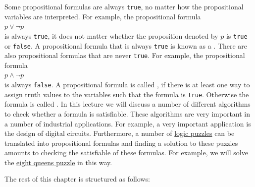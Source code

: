 Some propositional formulas are always \texttt{true}, no matter how the propositional variables are interpreted.
For example, the propositional formula 
\\[0.2cm]
\hspace*{1.3cm}
$p \vee \neg p$
\\[0.2cm]
is always \texttt{true}, it does not matter whether the proposition denoted by $p$ is \texttt{true} or \texttt{false}.  A propositional
formula that is always \texttt{true} is known as a  .  There are also propositional
formulas that are never \texttt{true}.  For example, the propositional formula
\\[0.2cm]
\hspace*{1.3cm}
$p \wedge \neg p$
\\[0.2cm]
is always \texttt{false}.  A propositional formula is called , if there is at least
one way to assign truth values to the variables such that the formula is \texttt{true}.  Otherwise the formula is called
.  In this lecture we will discuss a number of different algorithms to
check whether a formula is satisfiable.  These algorithms are very important in a number of industrial
applications.  For example, a very important application is the design of digital circuits.
Furthermore, a number of \href{https://en.wikipedia.org/wiki/Category:Logic_puzzles}{logic puzzles} can be
translated into propositional formulas and finding a solution to these 
puzzles amounts to checking the satisfiable of these formulas.  For example, we will solve the
\href{https://en.wikipedia.org/wiki/Eight_queens_puzzle}{eight queens puzzle} in this way.

The rest of this chapter is structured as follows:

